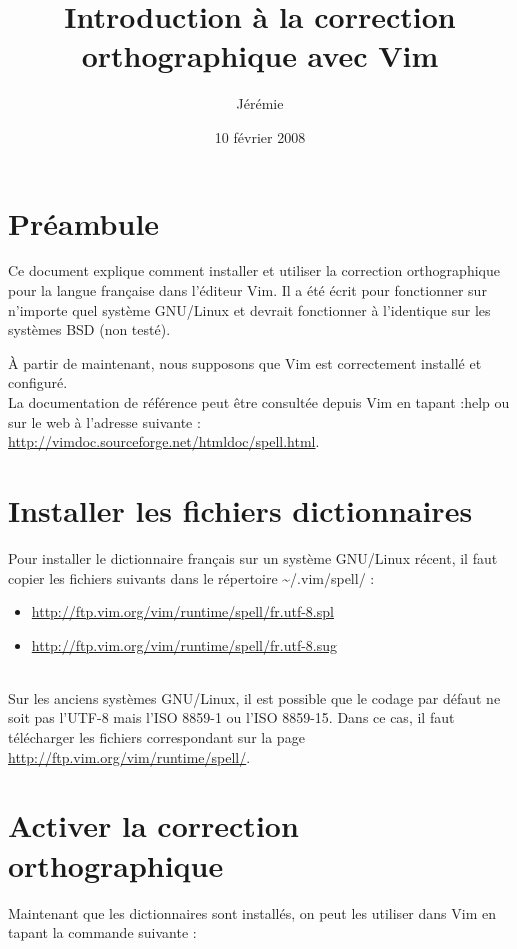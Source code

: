 \documentclass[pdftex,a4paper,11pt]{article}
\begin{document}
\title{Introduction à la correction orthographique avec Vim}
\author{Jérémie }
\date{10 février 2008}

\maketitle


\section{Préambule}
Ce document explique comment installer et utiliser la correction orthographique pour la langue française dans l'éditeur Vim. Il a été écrit pour fonctionner sur n'importe quel système GNU/Linux et devrait fonctionner à l'identique sur les systèmes BSD (non testé).

À partir de maintenant, nous supposons que Vim est correctement installé et configuré.\\

La documentation de référence peut être consultée depuis Vim en tapant \og{}:help\fg{} ou sur le web à l'adresse suivante : \url{http://vimdoc.sourceforge.net/htmldoc/spell.html}.


\section{Installer les fichiers dictionnaires}
Pour installer le dictionnaire français sur un système GNU/Linux récent, il faut copier les fichiers suivants dans le répertoire \textasciitilde{}/.vim/spell/ :
\begin{itemize}
	\item \url{http://ftp.vim.org/vim/runtime/spell/fr.utf-8.spl}
	\item \url{http://ftp.vim.org/vim/runtime/spell/fr.utf-8.sug}
\end{itemize}
~\\
Sur les anciens systèmes GNU/Linux, il est possible que le codage par défaut ne soit pas l'UTF-8 mais l'ISO 8859-1 ou l'ISO 8859-15. Dans ce cas, il faut télécharger les fichiers correspondant sur la page \url{http://ftp.vim.org/vim/runtime/spell/}.


\section{Activer la correction orthographique}
Maintenant que les dictionnaires sont installés, on peut les utiliser dans Vim en tapant la commande suivante :
\end{document}
